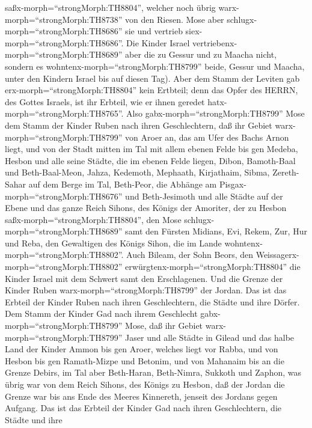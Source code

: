 saßx-morph=``strongMorph:TH8804'', welcher noch übrig
warx-morph=``strongMorph:TH8738'' von den Riesen. Mose aber
schlugx-morph=``strongMorph:TH8686'' sie und vertrieb
siex-morph=``strongMorph:TH8686''.  Die Kinder Israel
vertriebenx-morph=``strongMorph:TH8689'' aber die zu Gessur und zu
Maacha nicht, sondern es wohntenx-morph=``strongMorph:TH8799'' beide,
Gessur und Maacha, unter den Kindern Israel bis auf diesen Tag).
 Aber dem Stamm der Leviten gab
erx-morph=``strongMorph:TH8804'' kein Ertbteil; denn das Opfer des
HERRN, des Gottes Israels, ist ihr Erbteil, wie er ihnen geredet
hatx-morph=``strongMorph:TH8765''.  Also
gabx-morph=``strongMorph:TH8799'' Mose dem Stamm der Kinder Ruben nach
ihren Geschlechtern,  daß ihr Gebiet
warx-morph=``strongMorph:TH8799'' von Aroer an, das am Ufer des Bachs
Arnon liegt, und von der Stadt mitten im Tal mit allem ebenen Felde bis
gen Medeba,  Hesbon und alle seine Städte, die im ebenen
Felde liegen, Dibon, Bamoth-Baal und Beth-Baal-Meon, 
Jahza, Kedemoth, Mephaath,  Kirjathaim, Sibma, Zereth-Sahar
auf dem Berge im Tal,  Beth-Peor, die Abhänge am
Pisgax-morph=``strongMorph:TH8676'' und Beth-Jesimoth  und
alle Städte auf der Ebene und das ganze Reich Sihons, des Königs der
Amoriter, der zu Hesbon saßx-morph=``strongMorph:TH8804'', den Mose
schlugx-morph=``strongMorph:TH8689'' samt den Fürsten Midians, Evi,
Rekem, Zur, Hur und Reba, den Gewaltigen des Königs Sihon, die im Lande
wohntenx-morph=``strongMorph:TH8802''.  Auch Bileam, der
Sohn Beors, den Weissagerx-morph=``strongMorph:TH8802''
erwürgtenx-morph=``strongMorph:TH8804'' die Kinder Israel mit dem
Schwert samt den Erschlagenen.  Und die Grenze der Kinder
Ruben warx-morph=``strongMorph:TH8799'' der Jordan. Das ist das Erbteil
der Kinder Ruben nach ihren Geschlechtern, die Städte und ihre Dörfer.
 Dem Stamm der Kinder Gad nach ihrem Geschlecht
gabx-morph=``strongMorph:TH8799'' Mose,  daß ihr Gebiet
warx-morph=``strongMorph:TH8799'' Jaser und alle Städte in Gilead und
das halbe Land der Kinder Ammon bis gen Aroer, welches liegt vor Rabba,
 und von Hesbon bis gen Ramath-Mizpe und Betonim, und von
Mahanaim bis an die Grenze Debirs,  im Tal aber Beth-Haran,
Beth-Nimra, Sukkoth und Zaphon, was übrig war von dem Reich Sihons, des
Königs zu Hesbon, daß der Jordan die Grenze war bis ans Ende des Meeres
Kinnereth, jenseit des Jordans gegen Aufgang.  Das ist das
Erbteil der Kinder Gad nach ihren Geschlechtern, die Städte und ihre
